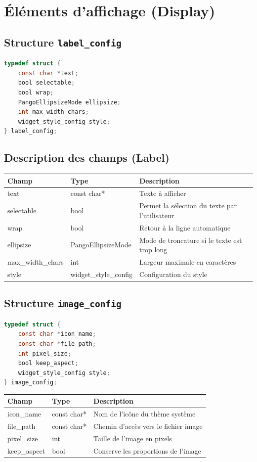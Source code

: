 \section{Éléments d'affichage (Display)}

\subsection{Structure \texttt{label\_config}}
\begin{lstlisting}[language=C]
typedef struct {
    const char *text;
    bool selectable;
    bool wrap;
    PangoEllipsizeMode ellipsize;
    int max_width_chars;
    widget_style_config style;
} label_config;
\end{lstlisting}

\subsection{Description des champs (Label)}
\begin{center}
\begin{tabular}{|l|l|p{5cm}|}
\hline
\textbf{Champ} & \textbf{Type} & \textbf{Description} \\
\hline
text & const char* & Texte à afficher \\
\hline
selectable & bool & Permet la sélection du texte par l'utilisateur \\
\hline
wrap & bool & Retour à la ligne automatique \\
\hline
ellipsize & PangoEllipsizeMode & Mode de troncature si le texte est trop long \\
\hline
max\_width\_chars & int & Largeur maximale en caractères \\
\hline
style & widget\_style\_config & Configuration du style \\
\hline
\end{tabular}
\end{center}

\subsection{Structure \texttt{image\_config}}
\begin{lstlisting}[language=C]
typedef struct {
    const char *icon_name;
    const char *file_path;
    int pixel_size;
    bool keep_aspect;
    widget_style_config style;
} image_config;
\end{lstlisting}

\begin{center}
\begin{tabular}{|l|l|p{5cm}|}
\hline
\textbf{Champ} & \textbf{Type} & \textbf{Description} \\
\hline
icon\_name & const char* & Nom de l'icône du thème système \\
\hline
file\_path & const char* & Chemin d'accès vers le fichier image \\
\hline
pixel\_size & int & Taille de l'image en pixels \\
\hline
keep\_aspect & bool & Conserve les proportions de l'image \\
\hline
\end{tabular}
\end{center}


